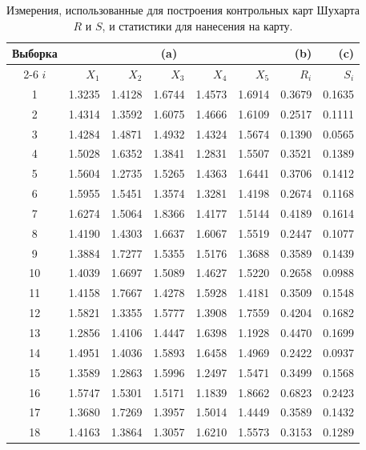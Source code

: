 \begin{table}[htbp]
	\centering
	\caption{Измерения, использованные для построения контрольных карт Шухарта \(R\) и \(S\), и статистики для нанесения на карту.}
	\label{tab:3.5}
	\renewcommand{\arraystretch}{1.05} %
	\begin{tabular}{c *{5}{r} r r}
		\toprule
		Выборка & \multicolumn{5}{c}{(a)} & (b) & (c) \\
		\cmidrule(lr){2-6}
		\(i\) & \(X_1\) & \(X_2\) & \(X_3\) & \(X_4\) & \(X_5\) & \(R_i\) & \(S_i\) \\
		\midrule
		1  & 1.3235 & 1.4128 & 1.6744 & 1.4573 & 1.6914 & 0.3679 & 0.1635 \\
		2  & 1.4314 & 1.3592 & 1.6075 & 1.4666 & 1.6109 & 0.2517 & 0.1111 \\
		3  & 1.4284 & 1.4871 & 1.4932 & 1.4324 & 1.5674 & 0.1390 & 0.0565 \\
		4  & 1.5028 & 1.6352 & 1.3841 & 1.2831 & 1.5507 & 0.3521 & 0.1389 \\
		5  & 1.5604 & 1.2735 & 1.5265 & 1.4363 & 1.6441 & 0.3706 & 0.1412 \\
		6  & 1.5955 & 1.5451 & 1.3574 & 1.3281 & 1.4198 & 0.2674 & 0.1168 \\
		7  & 1.6274 & 1.5064 & 1.8366 & 1.4177 & 1.5144 & 0.4189 & 0.1614 \\
		8  & 1.4190 & 1.4303 & 1.6637 & 1.6067 & 1.5519 & 0.2447 & 0.1077 \\
		9  & 1.3884 & 1.7277 & 1.5355 & 1.5176 & 1.3688 & 0.3589 & 0.1439 \\
		10 & 1.4039 & 1.6697 & 1.5089 & 1.4627 & 1.5220 & 0.2658 & 0.0988 \\
		11 & 1.4158 & 1.7667 & 1.4278 & 1.5928 & 1.4181 & 0.3509 & 0.1548 \\
		12 & 1.5821 & 1.3355 & 1.5777 & 1.3908 & 1.7559 & 0.4204 & 0.1682 \\
		13 & 1.2856 & 1.4106 & 1.4447 & 1.6398 & 1.1928 & 0.4470 & 0.1699 \\
		14 & 1.4951 & 1.4036 & 1.5893 & 1.6458 & 1.4969 & 0.2422 & 0.0937 \\
		15 & 1.3589 & 1.2863 & 1.5996 & 1.2497 & 1.5471 & 0.3499 & 0.1568 \\
		16 & 1.5747 & 1.5301 & 1.5171 & 1.1839 & 1.8662 & 0.6823 & 0.2423 \\
		17 & 1.3680 & 1.7269 & 1.3957 & 1.5014 & 1.4449 & 0.3589 & 0.1432 \\
		18 & 1.4163 & 1.3864 & 1.3057 & 1.6210 & 1.5573 & 0.3153 & 0.1289 \\

\end{tabular}
\end{table}
